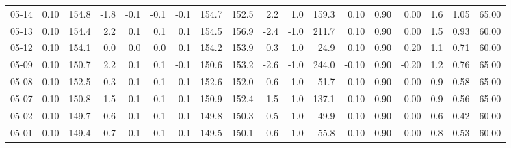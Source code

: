 \begin{threeparttable}
{\begin{tabular}{lrrrrrrrrrrrrrrrrr}
  05-14 &     0.10 & 154.8 &              -1.8 &              -0.1 &               -0.1 &               -0.1 & 154.7 & 152.5 &        2.2 &                      1.0 &               159.3 &       0.10 &      0.90 &           0.00 &              1.6 &            1.05 &                  65.00 \\
  05-13 &     0.10 & 154.4 &               2.2 &               0.1 &                0.1 &                0.1 & 154.5 & 156.9 &       -2.4 &                     -1.0 &               211.7 &       0.10 &      0.90 &           0.00 &              1.5 &            0.93 &                  60.00 \\
  05-12 &     0.10 & 154.1 &               0.0 &               0.0 &                0.0 &                0.1 & 154.2 & 153.9 &        0.3 &                      1.0 &                24.9 &       0.10 &      0.90 &           0.20 &              1.1 &            0.71 &                  60.00 \\
  05-09 &     0.10 & 150.7 &               2.2 &               0.1 &                0.1 &               -0.1 & 150.6 & 153.2 &       -2.6 &                     -1.0 &               244.0 &      -0.10 &      0.90 &          -0.20 &              1.2 &            0.76 &                  65.00 \\
  05-08 &     0.10 & 152.5 &              -0.3 &              -0.1 &               -0.1 &                0.1 & 152.6 & 152.0 &        0.6 &                      1.0 &                51.7 &       0.10 &      0.90 &           0.00 &              0.9 &            0.58 &                  65.00 \\
  05-07 &     0.10 & 150.8 &               1.5 &               0.1 &                0.1 &                0.1 & 150.9 & 152.4 &       -1.5 &                     -1.0 &               137.1 &       0.10 &      0.90 &           0.00 &              0.9 &            0.56 &                  65.00 \\
  05-02 &     0.10 & 149.7 &               0.6 &               0.1 &                0.1 &                0.1 & 149.8 & 150.3 &       -0.5 &                     -1.0 &                49.9 &       0.10 &      0.90 &           0.00 &              0.6 &            0.42 &                  60.00 \\
  05-01 &     0.10 & 149.4 &               0.7 &               0.1 &                0.1 &                0.1 & 149.5 & 150.1 &       -0.6 &                     -1.0 &                55.8 &       0.10 &      0.90 &           0.00 &              0.8 &            0.53 &                  60.00 \\

\end{tabular}}
\end{threeparttable}
